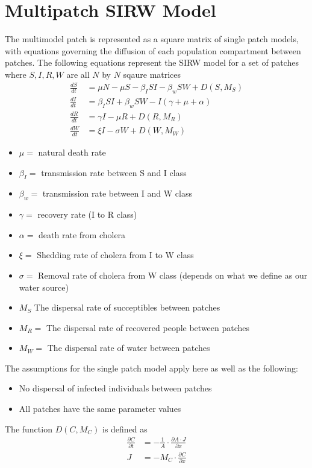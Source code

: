 \documentclass[12pt]{article}\usepackage[]{graphicx}\usepackage[]{color}
\begin{document}
\section{Multipatch SIRW Model}

The multimodel patch is represented as a square matrix of single patch models, with equations governing the diffusion of each population compartment between patches.
The following equations represent the SIRW model for a set of patches where $S,I,R,W$ are all $N$ by $N$ sqaure matrices
\begin{align*}
    \frac{dS}{dt}&= \mu N - \mu S - \beta_I S I - \beta_w S W + D(S,M_S)\\
    \frac{dI}{dt}&= \beta_I S I + \beta_w S W - I(\gamma + \mu + \alpha)\\
    \frac{dR}{dt}&= \gamma I - \mu R  + D(R,M_R) \\
    \frac{dW}{dt}&= \xi I - \sigma W + D(W,M_W)
\end{align*}
\begin{itemize}
    \item$\mu=$ natural death rate
    \item$\beta_I=$ transmission rate between S and I class
    \item$\beta_w=$ transmission rate between I and W class
    \item$\gamma=$ recovery rate (I to R class)
    \item$\alpha=$ death rate from cholera
    \item$\xi=$ Shedding rate of cholera from I to W class
    \item$\sigma=$	Removal rate of cholera from W class (depends on what we define as our water source)
    \item$M_S$ The dispersal rate of succeptibles between patches
    \item$M_R=$ The dispersal rate of recovered people between patches
    \item$M_W=$ The dispersal rate of water between patches
\end{itemize}
The assumptions for the single patch model apply here as well as the following:
\begin{itemize}
    \item No dispersal of infected individuals between patches
    \item All patches have the same parameter values
\end{itemize}
The function $D(C,M_C)$ is defined as
\begin{align*}
    \frac{\partial C}{\partial t} &= -\frac{1}{A} \cdot \frac{\partial A \cdot J}{\partial x}\\
    J &= - M_C \cdot \frac{\partial C}{\partial x}
\end{align*}
\end{document}
